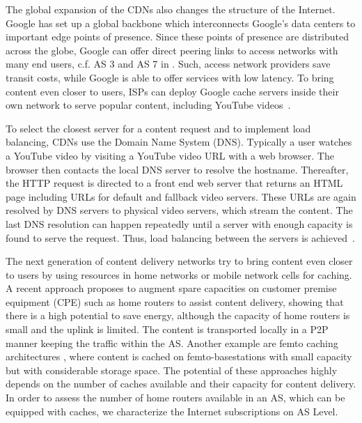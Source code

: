 The global expansion of the CDNs also changes the structure of the Internet.
Google has set up a global backbone which interconnects Google's data centers to important edge points of presence.
Since these points of presence are distributed across the globe, Google can offer direct peering links to access networks with many end users, c.f. AS 3 and AS 7 in .
Such, access network providers save transit costs, while Google is able to offer services with low latency.
To bring content even closer to users, ISPs can deploy Google cache servers inside their own network to serve popular content, including YouTube videos~\cite{gcc}.

To select the closest server for a content request and to implement load balancing, CDNs use the Domain Name System (DNS).
Typically a user watches a YouTube video by visiting a YouTube video URL with a web browser.
The browser then contacts the local DNS server to resolve the hostname.
Thereafter, the HTTP request is directed to a front end web server that returns an HTML page including URLs for default and fallback video servers.
These URLs are again resolved by DNS servers to physical video servers, which stream the content.
The last DNS resolution can happen repeatedly until a server with enough capacity is found to serve the request.
Thus, load balancing between the servers is achieved~\cite{adhikari2012vivisecting}.

The next generation of content delivery networks try to bring content even closer to users by using resources in home networks or mobile network cells for caching.
A recent approach \cite{valancius2009greening} proposes to augment spare capacities on customer premise equipment (CPE) such as home routers to assist content delivery, showing that there is a high potential to save energy, although the capacity of home routers is small and the uplink is limited.
The content is transported locally in a P2P manner keeping the traffic within the AS.
Another example are femto caching architectures \cite{golrezaei2013femtocaching}, where content is cached on femto-basestations with small capacity but with considerable storage space.
The potential of these approaches highly depends on the number of caches available and their capacity for content delivery.
In order to assess the number of home routers available in an AS, which can be equipped with caches, we characterize the Internet subscriptions on AS Level.

%

